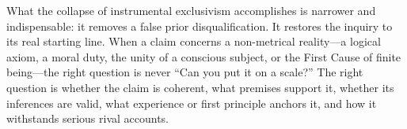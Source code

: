 What the collapse of instrumental exclusivism accomplishes is narrower and indispensable: it removes a false prior disqualification. It restores the inquiry to its real starting line. When a claim concerns a non-metrical reality---a logical axiom, a moral duty, the unity of a conscious subject, or the First Cause of finite being---the right question is never ``Can you put it on a scale?'' The right question is whether the claim is coherent, what premises support it, whether its inferences are valid, what experience or first principle anchors it, and how it withstands serious rival accounts.
